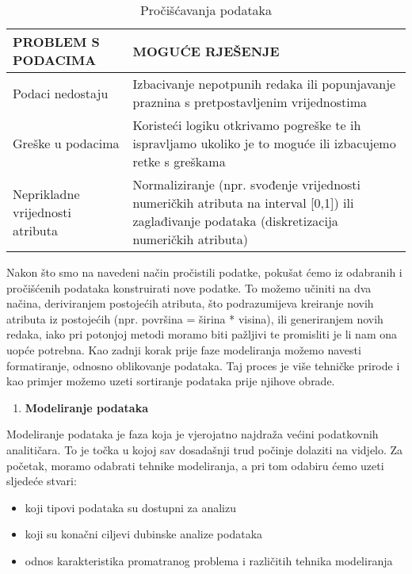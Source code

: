 \documentclass[times, utf8, zavrsni, numeric]{fer}
\begin{document}
\begin{table}[htb]
\caption{Pročišćavanja podataka}
\begin{tabular}{| l | p{8cm} |}
    \hline
    \textbf{PROBLEM S PODACIMA} & \textbf{MOGUĆE RJEŠENJE} \\ \hline
    Podaci nedostaju & Izbacivanje nepotpunih redaka ili popunjavanje praznina s pretpostavljenim vrijednostima \\ \hline
    Greške u podacima & Koristeći logiku otkrivamo pogreške te ih ispravljamo ukoliko je to moguće ili izbacujemo retke s greškama\\ \hline
    Neprikladne vrijednosti atributa & Normaliziranje (npr. svođenje vrijednosti numeričkih atributa na interval [0,1]) ili zaglađivanje podataka (diskretizacija numeričkih atributa) \\
    \hline
\end{tabular}
\label{fig:pripremapod}
\end{table}
Nakon što smo na navedeni način pročistili podatke, pokušat ćemo iz odabranih i pročišćenih podataka konstruirati nove podatke. To možemo učiniti na dva načina, deriviranjem postojećih atributa, što podrazumijeva kreiranje novih atributa iz postojećih (npr. površina = širina * visina), ili generiranjem novih redaka, iako pri potonjoj metodi moramo biti pažljivi te promisliti je li nam ona uopće potrebna. Kao zadnji korak prije faze modeliranja možemo navesti formatiranje, odnosno oblikovanje podataka. Taj proces je više tehničke prirode i kao primjer možemo uzeti sortiranje podataka prije njihove obrade.\cite{crisp1}\cite{crisp3}
\begin{enumerate}[resume]
\item \textbf{Modeliranje podataka}
\end{enumerate}
Modeliranje podataka je faza koja je vjerojatno najdraža većini podatkovnih analitičara. To je točka u kojoj sav dosadašnji trud počinje dolaziti na vidjelo. Za početak, moramo odabrati tehnike modeliranja, a pri tom odabiru ćemo uzeti sljedeće stvari:
\begin{itemize}
\item koji tipovi podataka su dostupni za analizu
\item koji su konačni ciljevi dubinske analize podataka
\item odnos karakteristika promatranog problema i različitih tehnika modeliranja
\end{itemize}
\end{document}
